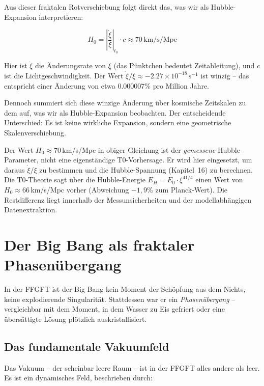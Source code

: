 \documentclass[12pt,a4paper]{article}
\begin{document}
Aus dieser fraktalen Rotverschiebung folgt direkt das, was wir als Hubble-Expansion interpretieren:

\begin{equation}
H_0 = \left|\frac{\dot{\xi}}{\xi}\right|_{t_0} \cdot c \approx 70 \, \text{km/s/Mpc}
\end{equation}

Hier ist $\dot{\xi}$ die Änderungsrate von $\xi$ (das Pünktchen bedeutet Zeitableitung), und $c$ ist die Lichtgeschwindigkeit. Der Wert $\dot{\xi}/\xi \approx -2.27 \times 10^{-18} \, \text{s}^{-1}$ ist winzig -- das entspricht einer Änderung von etwa 0.000007\% pro Million Jahre.

Dennoch summiert sich diese winzige Änderung über kosmische Zeitskalen zu dem auf, was wir als Hubble-Expansion beobachten. Der entscheidende Unterschied: Es ist keine wirkliche Expansion, sondern eine geometrische Skalenverschiebung.

\begin{remark}
Der Wert $H_0 \approx 70\,$km/s/Mpc in obiger Gleichung ist der \emph{gemessene} Hubble-Parameter, nicht eine eigenständige T0-Vorhersage. Er wird hier eingesetzt, um daraus $\dot{\xi}/\xi$ zu bestimmen und die Hubble-Spannung (Kapitel~16) zu berechnen. Die T0-Theorie sagt über die Hubble-Energie $E_H = E_0 \cdot \xi^{41/4}$ einen Wert von $H_0 \approx 66\,$km/s/Mpc vorher (Abweichung $-1{,}9\%$ zum Planck-Wert). Die Restdifferenz liegt innerhalb der Messunsicherheiten und der modellabhängigen Datenextraktion.
\end{remark}

\section{Der Big Bang als fraktaler Phasenübergang}

In der FFGFT ist der Big Bang kein Moment der Schöpfung aus dem Nichts, keine explodierende Singularität. Stattdessen war er ein \textit{Phasenübergang} -- vergleichbar mit dem Moment, in dem Wasser zu Eis gefriert oder eine übersättigte Lösung plötzlich auskristallisiert.

\subsection{Das fundamentale Vakuumfeld}

Das Vakuum -- der scheinbar leere Raum -- ist in der FFGFT alles andere als leer. Es ist ein dynamisches Feld, beschrieben durch:
\end{document}
